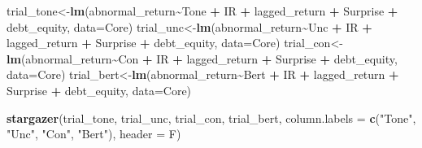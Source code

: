 \documentclass[
]{article}
\newenvironment{Shaded}{\begin{snugshade}}{\end{snugshade}}
\newcommand{\AttributeTok}[1]{\textcolor[rgb]{0.13,0.29,0.53}{#1}}
\newcommand{\FunctionTok}[1]{\textcolor[rgb]{0.13,0.29,0.53}{\textbf{#1}}}
\newcommand{\NormalTok}[1]{#1}
\newcommand{\OtherTok}[1]{\textcolor[rgb]{0.56,0.35,0.01}{#1}}
\newcommand{\SpecialCharTok}[1]{\textcolor[rgb]{0.81,0.36,0.00}{\textbf{#1}}}
\newcommand{\StringTok}[1]{\textcolor[rgb]{0.31,0.60,0.02}{#1}}
\begin{document}
\begin{Shaded}
\begin{Highlighting}[]
\NormalTok{trial\_tone}\OtherTok{\textless{}{-}}\FunctionTok{lm}\NormalTok{(abnormal\_return}\SpecialCharTok{\textasciitilde{}}\NormalTok{Tone }\SpecialCharTok{+}\NormalTok{ IR }\SpecialCharTok{+}\NormalTok{ lagged\_return }\SpecialCharTok{+}\NormalTok{ Surprise }\SpecialCharTok{+}\NormalTok{ debt\_equity, }\AttributeTok{data=}\NormalTok{Core)}
\NormalTok{trial\_unc}\OtherTok{\textless{}{-}}\FunctionTok{lm}\NormalTok{(abnormal\_return}\SpecialCharTok{\textasciitilde{}}\NormalTok{Unc }\SpecialCharTok{+}\NormalTok{ IR }\SpecialCharTok{+}\NormalTok{ lagged\_return }\SpecialCharTok{+}\NormalTok{ Surprise }\SpecialCharTok{+}\NormalTok{ debt\_equity, }\AttributeTok{data=}\NormalTok{Core)}
\NormalTok{trial\_con}\OtherTok{\textless{}{-}}\FunctionTok{lm}\NormalTok{(abnormal\_return}\SpecialCharTok{\textasciitilde{}}\NormalTok{Con }\SpecialCharTok{+}\NormalTok{ IR }\SpecialCharTok{+}\NormalTok{ lagged\_return }\SpecialCharTok{+}\NormalTok{ Surprise }\SpecialCharTok{+}\NormalTok{ debt\_equity, }\AttributeTok{data=}\NormalTok{Core)}
\NormalTok{trial\_bert}\OtherTok{\textless{}{-}}\FunctionTok{lm}\NormalTok{(abnormal\_return}\SpecialCharTok{\textasciitilde{}}\NormalTok{Bert }\SpecialCharTok{+}\NormalTok{ IR }\SpecialCharTok{+}\NormalTok{ lagged\_return }\SpecialCharTok{+}\NormalTok{ Surprise }\SpecialCharTok{+}\NormalTok{ debt\_equity, }\AttributeTok{data=}\NormalTok{Core)}

\FunctionTok{stargazer}\NormalTok{(trial\_tone, trial\_unc, trial\_con, trial\_bert,}
          \AttributeTok{column.labels =} \FunctionTok{c}\NormalTok{(}\StringTok{"Tone"}\NormalTok{, }\StringTok{"Unc"}\NormalTok{, }\StringTok{"Con"}\NormalTok{, }\StringTok{"Bert"}\NormalTok{), }\AttributeTok{header =}\NormalTok{ F)}
\end{Highlighting}
\end{Shaded}
\end{document}
